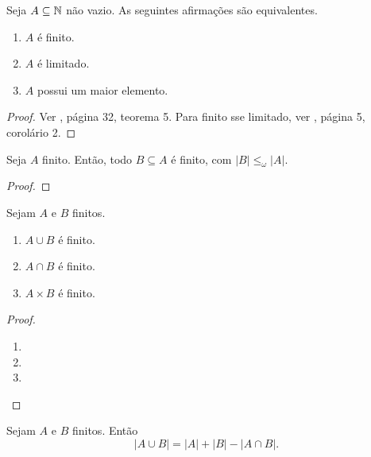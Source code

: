 \begin{theorem}
    Seja $A \subseteq \mathbb{N}$ não vazio. As seguintes afirmações são equivalentes.
        \begin{enumerate}[label=\roman*.]
            \item $A$ é finito.
            \item $A$ é limitado.
            \item $A$ possui um maior elemento.
        \end{enumerate}
\end{theorem}

\begin{proof}
      Ver \cite{cursodeanalise1}, página 32, teorema 5. Para finito sse limitado, ver \cite{analisereal1}, página 5, corolário 2.
\end{proof}

\begin{theorem}
    Seja $A$ finito. Então, todo $B \subseteq A$ é finito, com $|B| \leq_{\omega} |A|$.
\end{theorem}

\begin{proof}
    \blackproof
\end{proof}

\begin{proposition}
    Sejam $A$ e $B$ finitos.
        \begin{enumerate}[leftmargin=*, align=left, label=\textbf{(\alph*)}]
            \item $A \cup B$ é finito.
            \item $A \cap B$ é finito.
            \item $A \times B$ é finito.
        \end{enumerate}
\end{proposition}

\begin{proof}
    \leavevmode
        \begin{enumerate}[leftmargin=*, align=left, label=\textbf{(\alph*)}]
            \item \blackproof
            \item \blackproof
            \item \blackproof
        \end{enumerate}
\end{proof}

\begin{proposition}
    Sejam $A$ e $B$ finitos. Então
        \[
            |A \cup B| = |A| + |B| - |A \cap B|.
        \]
\end{proposition}

